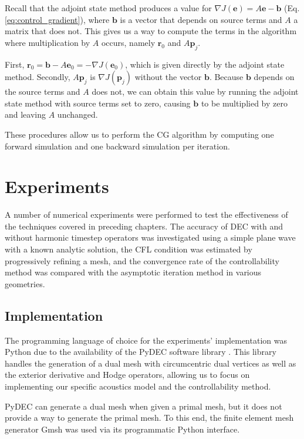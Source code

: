 \documentclass[utf8,english]{gradu3}
\begin{document}
Recall that the adjoint state method produces a value for
$\nabla J(\mathbf{e}) = A\mathbf{e} - \mathbf{b}$ (Eq. \eqref{eq:control_gradient}),
where $\mathbf{b}$ is a vector that depends on source terms and $A$
a matrix that does not.
This gives us a way to compute the terms in the algorithm
where multiplication by $A$ occurs,
namely $\mathbf{r}_0$ and $A\mathbf{p}_j$.

First, $\mathbf{r}_0 = \mathbf{b} - A\mathbf{e}_0 = -\nabla J(\mathbf{e}_0)$,
which is given directly by the adjoint state method.
Secondly, $A\mathbf{p}_j$ is $\nabla J(\mathbf{p}_j)$ without the vector $\mathbf{b}$.
Because $\mathbf{b}$ depends on the source terms and $A$ does not,
we can obtain this value by running the adjoint state method
with source terms set to zero, causing $\mathbf{b}$ to be multiplied by zero
and leaving $A$ unchanged.

These procedures allow us to perform the CG algorithm
by computing one forward simulation and one backward simulation per iteration.


\chapter{Experiments}\label{cha:experiments}

A number of numerical experiments were performed
to test the effectiveness of the techniques
covered in preceding chapters.
The accuracy of DEC with and without harmonic timestep operators
was investigated using a simple plane wave with a known analytic solution,
the CFL condition was estimated by progressively refining a mesh,
and the convergence rate of the controllability method was compared
with the asymptotic iteration method in various geometries.


\section{Implementation}\label{sec:implementation}

The programming language of choice for the experiments' implementation
was Python due to the availability
of the PyDEC software library \parencite{bell_pydec_2012}.
This library handles the generation of a dual mesh
with circumcentric dual vertices
as well as the exterior derivative and Hodge operators,
allowing us to focus on implementing our specific acoustics model
and the controllability method.

PyDEC can generate a dual mesh when given a primal mesh,
but it does not provide a way to generate the primal mesh.
To this end, the finite element mesh generator Gmsh \parencite{geuzaine_gmsh_2009}
was used via its programmatic Python interface.
\end{document}
